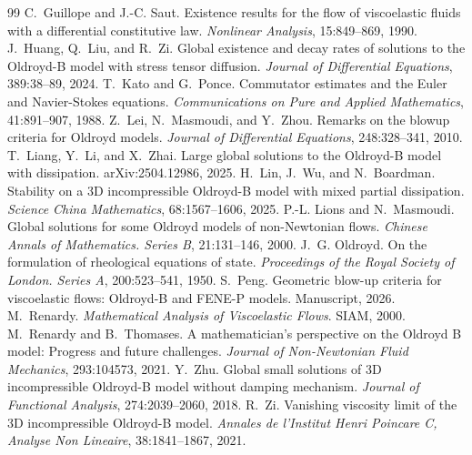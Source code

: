 \documentclass[10pt,a4paper]{amsart}
\numberwithin{equation}{section}
\begin{document}
\begin{thebibliography}{99}
 C.~Guillope and J.-C. Saut. \newblock Existence results for the flow of viscoelastic fluids with a differential constitutive law. \newblock \emph{Nonlinear Analysis}, 15:849--869, 1990.
 J.~Huang, Q.~Liu, and R.~Zi. \newblock Global existence and decay rates of solutions to the Oldroyd-B model with stress tensor diffusion. \newblock \emph{Journal of Differential Equations}, 389:38--89, 2024.
 T.~Kato and G.~Ponce. \newblock Commutator estimates and the Euler and Navier-Stokes equations. \newblock \emph{Communications on Pure and Applied Mathematics}, 41:891--907, 1988.
 Z.~Lei, N.~Masmoudi, and Y.~Zhou. \newblock Remarks on the blowup criteria for Oldroyd models. \newblock \emph{Journal of Differential Equations}, 248:328--341, 2010.
 T.~Liang, Y.~Li, and X.~Zhai. \newblock Large global solutions to the Oldroyd-B model with dissipation. \newblock arXiv:2504.12986, 2025.
 H.~Lin, J.~Wu, and N.~Boardman. \newblock Stability on a 3D incompressible Oldroyd-B model with mixed partial dissipation. \newblock \emph{Science China Mathematics}, 68:1567--1606, 2025.
 P.-L. Lions and N.~Masmoudi. \newblock Global solutions for some Oldroyd models of non-Newtonian flows. \newblock \emph{Chinese Annals of Mathematics. Series B}, 21:131--146, 2000.
 J.~G. Oldroyd. \newblock On the formulation of rheological equations of state. \newblock \emph{Proceedings of the Royal Society of London. Series A}, 200:523--541, 1950.
 S.~Peng. \newblock Geometric blow-up criteria for viscoelastic flows: Oldroyd-B and FENE-P models. \newblock Manuscript, 2026.
 M.~Renardy. \newblock \emph{Mathematical Analysis of Viscoelastic Flows}. \newblock SIAM, 2000.
 M.~Renardy and B.~Thomases. \newblock A mathematician's perspective on the Oldroyd B model: Progress and future challenges. \newblock \emph{Journal of Non-Newtonian Fluid Mechanics}, 293:104573, 2021.
 Y.~Zhu. \newblock Global small solutions of 3D incompressible Oldroyd-B model without damping mechanism. \newblock \emph{Journal of Functional Analysis}, 274:2039--2060, 2018.
 R.~Zi. \newblock Vanishing viscosity limit of the 3D incompressible Oldroyd-B model. \newblock \emph{Annales de l'Institut Henri Poincare C, Analyse Non Lineaire}, 38:1841--1867, 2021.
\end{thebibliography}
\end{document}
